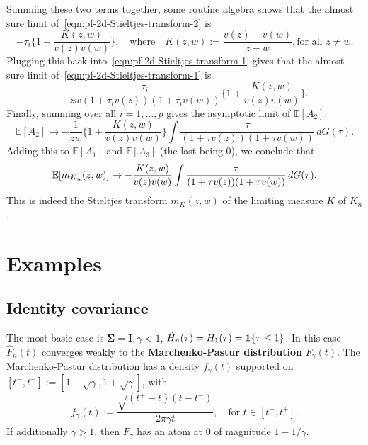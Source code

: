 \documentclass{article}
\newcommand{\bSigma}{\boldsymbol{\Sigma}}
\newcommand{\bI}{\boldsymbol{I}}
\begin{document}
Summing these two terms together, some routine algebra shows that the almost sure limit of~\eqref{eqn:pf-2d-Stieltjes-transform-2} is
\begin{equation*}
	-\tau_i \Big\{1 + \frac{K(z,w)}{v(z)v(w)}\Big\}, \quad \textrm{where}\quad K(z,w) := \frac{v(z) - v(w)}{z - w}, \textrm{for all $z \neq w$.}
\end{equation*}
Plugging this back into~\eqref{eqn:pf-2d-Stieltjes-transform-1} gives that the almost sure limit of~\eqref{eqn:pf-2d-Stieltjes-transform-1} is
\begin{equation*}
	-\frac{\tau_i}{zw(1 + \tau_i v(z)) (1 + \tau_i v(w))} \Big\{1 + \frac{K(z,w)}{v(z)v(w)}\Big\}.
\end{equation*}
Finally, summing over all $i = 1,\ldots,p$ gives the asymptotic limit of $\mathbb{E}[A_2]$:
\begin{equation*}
	\mathbb{E}[A_2] \to -\frac{1}{zw}\Big\{1 + \frac{K(z,w)}{v(z)v(w)}\Big\}\int \frac{\tau}{(1 + \tau v(z)) (1 + \tau v(w))} \,dG(\tau).
\end{equation*}
Adding this to $\mathbb{E}[A_1]$ and $\mathbb{E}[A_3]$ (the last being $0$), we conclude that 
\begin{equation*}
	\mathbb{E}[m_{K_n}(z,w)] \to -\frac{K(z,w)}{v(z) v(w)} \int \frac{\tau}{(1 + \tau v(z)) (1 + \tau v(w))} \,dG(\tau).
\end{equation*}
This is indeed the Stieltjes transform $m_{K}(z,w)$ of the limiting measure $K$ of $K_n$.

\section{Examples}

\subsection{Identity covariance}

The most basic case is $\bSigma = \bI, \gamma < 1$, $\hat{H}_n(\tau) = H_1(\tau) = \mathbf{1}\{\tau \leq 1\}$. In this case $\hat{F}_n(t)$ converges weakly to the {\bf Marchenko-Pastur distribution} $F_{\gamma}(t)$. The Marchenko-Pastur distribution has a density $f_{\gamma}(t)$ supported on $[t^{-},t^{+}] := [1 - \sqrt{\gamma}, 1 + \sqrt{\gamma}]$, with 
$$
f_{\gamma}(t) := \frac{\sqrt{(t^{+} - t)(t - t^{-})}}{2 \pi \gamma t}, \quad \textrm{for $t \in [t^{-},t^{+}]$.}
$$
If additionally $\gamma > 1$, then $F_{\gamma}$ has an atom at $0$ of magnitude $1 - 1/\gamma$. 
\end{document}
